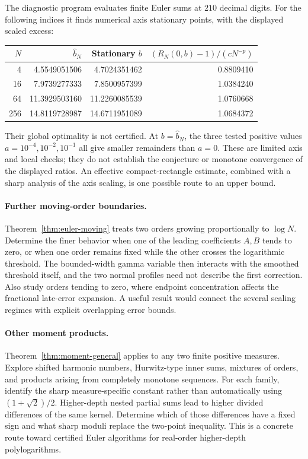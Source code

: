 The diagnostic program 
evaluates finite Euler sums at $210$ decimal digits.
For the following indices it finds numerical axis stationary
points, with the displayed scaled excess:
\begin{center}
\small
\begin{tabular}{@{}rrrr@{}}
\toprule
$N$ & $\widehat b_N$ & Stationary $b$ &
$(R_N(0,b)-1)/(cN^{-p})$\\
\midrule
4   & 4.5549051506  & 4.7024351462  & 0.8809410\\
16  & 7.9739277333  & 7.8500957399  & 1.0384240\\
64  & 11.3929503160 & 11.2260085539 & 1.0760668\\
256 & 14.8119728987 & 14.6711951089 & 1.0684372\\
\bottomrule
\end{tabular}
\end{center}
Their global optimality is not certified. At $b=\widehat b_N$,
the three tested positive values $a=10^{-4},10^{-2},10^{-1}$
all give smaller remainders than $a=0$. These are limited axis
and local checks; they do not establish the conjecture or
monotone convergence of the displayed ratios. An effective
compact-rectangle estimate, combined with a sharp analysis
of the axis scaling, is one possible route to an upper bound.

\paragraph{Further moving-order boundaries.}
Theorem~\ref{thm:euler-moving} treats two orders growing
proportionally to $\log N$. Determine the finer behavior
when one of the leading coefficients $A,B$ tends to zero,
or when one order remains fixed while the other crosses
the logarithmic threshold. The bounded-width gamma variable
then interacts with the smoothed threshold itself, and the
two normal profiles need not describe the first correction.
Also study orders tending to zero, where endpoint
concentration affects the fractional late-error expansion.
A useful result would connect the several scaling regimes
with explicit overlapping error bounds.

\paragraph{Other moment products.}
Theorem~\ref{thm:moment-general} applies to any two finite
positive measures. Explore shifted harmonic numbers,
Hurwitz-type inner sums, mixtures of orders, and products
arising from completely monotone sequences. For each family,
identify the sharp measure-specific constant rather than
automatically using $(1+\sqrt2)/2$.
Higher-depth nested partial sums lead to higher divided
differences of the same kernel. Determine which of those
differences have a fixed sign and what sharp moduli replace
the two-point inequality. This is a concrete route toward
certified Euler algorithms for real-order higher-depth
polylogarithms.

